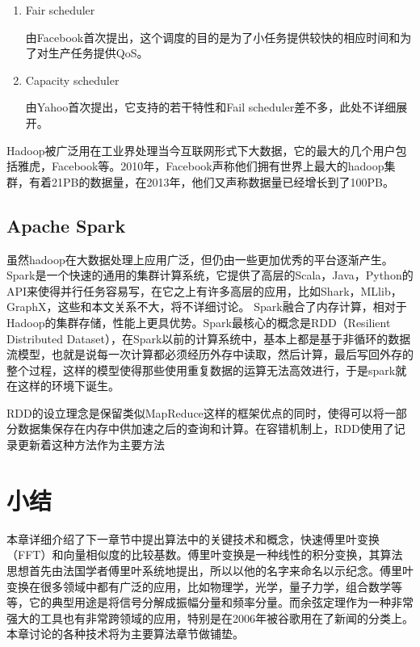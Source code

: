 \begin{enumerate}
\item Fair scheduler

由Facebook首次提出，这个调度的目的是为了小任务提供较快的相应时间和为了对生产任务提供QoS。
\item Capacity scheduler

由Yahoo首次提出，它支持的若干特性和Fail scheduler差不多，此处不详细展开。
\end{enumerate}

Hadoop被广泛用在工业界处理当今互联网形式下大数据，它的最大的几个用户包括雅虎，Facebook等。2010年，Facebook声称他们拥有世界上最大的hadoop集群，有着21PB的数据量，在2013年，他们又声称数据量已经增长到了100PB。

\subsection{Apache Spark}
虽然hadoop在大数据处理上应用广泛，但仍由一些更加优秀的平台逐渐产生。
Spark是一个快速的通用的集群计算系统，它提供了高层的Scala，Java，Python的API来使得并行任务容易写，在它之上有许多高层的应用，比如Shark，MLlib，GraphX，这些和本文关系不大，将不详细讨论。
Spark融合了内存计算，相对于Hadoop的集群存储，性能上更具优势。Spark最核心的概念是RDD（Resilient Distributed Dataset），在Spark以前的计算系统中，基本上都是基于非循环的数据流模型，也就是说每一次计算都必须经历外存中读取，然后计算，最后写回外存的整个过程，这样的模型使得那些使用重复数据的运算无法高效进行，于是spark就在这样的环境下诞生。

RDD的设立理念是保留类似MapReduce这样的框架优点的同时，使得可以将一部分数据集保存在内存中供加速之后的查询和计算。在容错机制上，RDD使用了记录更新着这种方法作为主要方法
\section{小结}
\label{sec:conc}

本章详细介绍了下一章节中提出算法中的关键技术和概念，快速傅里叶变换（FFT）和向量相似度的比较基数。傅里叶变换是一种线性的积分变换，其算法思想首先由法国学者傅里叶系统地提出，所以以他的名字来命名以示纪念。傅里叶变换在很多领域中都有广泛的应用，比如物理学，光学，量子力学，组合数学等等，它的典型用途是将信号分解成振幅分量和频率分量。而余弦定理作为一种非常强大的工具也有非常跨领域的应用，特别是在2006年被谷歌用在了新闻的分类上。本章讨论的各种技术将为主要算法章节做铺垫。
